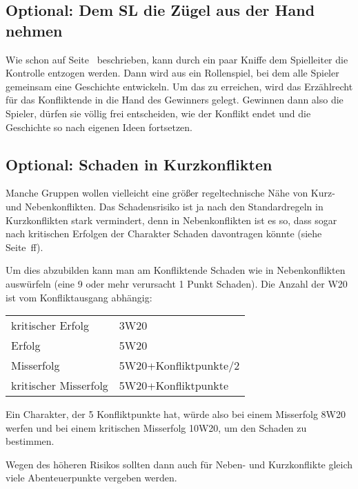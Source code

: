 \begin{optional}
\section{Optional: Dem SL die Zügel aus der Hand nehmen}
Wie schon auf Seite~\pageref{Optional:ZuegelAusDerHand1} beschrieben, kann durch ein paar Kniffe dem Spielleiter die Kontrolle entzogen werden. Dann wird aus \StoryDSA ein Rollenspiel, bei dem alle Spieler gemeinsam eine Geschichte entwickeln. Um das zu erreichen, wird das Erzählrecht für das Konfliktende in die Hand des Gewinners gelegt. Gewinnen dann also die Spieler, dürfen sie völlig frei entscheiden, wie der Konflikt endet und die Geschichte so nach eigenen Ideen fortsetzen.
\end{optional}

\begin{optional}
\section{Optional: Schaden in Kurzkonflikten}

Manche Gruppen wollen vielleicht eine größer regeltechnische Nähe von Kurz- und Nebenkonflikten. Das Schadensrisiko ist ja nach den Standardregeln in Kurzkonflikten stark vermindert, denn in Nebenkonflikten ist es so, dass sogar nach kritischen Erfolgen der Charakter Schaden davontragen könnte (siehe Seite~\pageref{Sec:Nebenkonflikt}ff).

Um dies abzubilden kann man am Konfliktende Schaden wie in Nebenkonflikten auswürfeln (eine 9 oder mehr verursacht 1 Punkt Schaden). Die Anzahl der W20 ist vom Konfliktausgang abhängig:
\begin{tabular}[C]{|ll|}
\hline
kritischer Erfolg & 3W20 \\
Erfolg & 5W20 \\
Misserfolg & 5W20+Konfliktpunkte/2 \\
kritischer Misserfolg & 5W20+Konfliktpunkte \\
\hline
\end{tabular}
Ein Charakter, der 5 Konfliktpunkte hat, würde also bei einem Misserfolg 8W20 werfen und bei einem kritischen Misserfolg 10W20, um den Schaden zu bestimmen.

Wegen des höheren Risikos sollten dann auch für Neben- und Kurzkonflikte gleich viele Abenteuerpunkte vergeben werden.
\end{optional}







